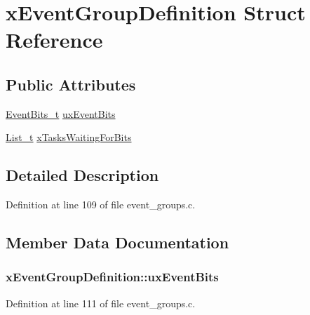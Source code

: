 \hypertarget{structx_event_group_definition}{}\section{x\+Event\+Group\+Definition Struct Reference}
\label{structx_event_group_definition}
\subsection*{Public Attributes}
\begin{DoxyCompactItemize}
\item 
\hyperlink{event__groups_8h_ab2f21b93db0b2a0ab64d7a81ff32ac2e}{Event\+Bits\+\_\+t} \hyperlink{structx_event_group_definition_ad7c19a46f5f4557e466209962b5e4610}{ux\+Event\+Bits}
\item 
\hyperlink{list_8h_afd590ef6400071b4d63d65ef90bea7f4}{List\+\_\+t} \hyperlink{structx_event_group_definition_a6570ba98d93dcba9cb03de0c62df9044}{x\+Tasks\+Waiting\+For\+Bits}
\end{DoxyCompactItemize}


\subsection{Detailed Description}


Definition at line 109 of file event\+\_\+groups.\+c.



\subsection{Member Data Documentation}
\subsubsection[{\texorpdfstring{ux\+Event\+Bits}{uxEventBits}}]{ x\+Event\+Group\+Definition\+::ux\+Event\+Bits}\hypertarget{structx_event_group_definition_ad7c19a46f5f4557e466209962b5e4610}{}\label{structx_event_group_definition_ad7c19a46f5f4557e466209962b5e4610}


Definition at line 111 of file event\+\_\+groups.\+c.

